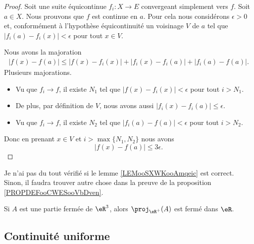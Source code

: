 \begin{proof}
	Soit une suite équicontinue \( f_i\colon X\to E\) convergeant simplement vers \( f\). Soit \( a\in X\). Nous prouvons que \( f\) est continue en \( a\). Pour cela nous considérons \( \epsilon>0\) et, conformément à l'hypothèse équicontinuité un voisinage \( V\) de \( a\) tel que \( | f_i(a)-f_i(x) |<\epsilon\) pour tout \( x\in V\).

	Nous avons la majoration
	\begin{subequations}
		\begin{align}
			| f(x)-f(a) |\leq | f(x)-f_i(x) |+| f_i(x)-f_i(a) |+| f_i(a)-f(a) |.
		\end{align}
	\end{subequations}
	Plusieurs majorations.
	\begin{itemize}
		\item
		      Vu que \( f_i\to f\), il existe \( N_1\) tel que \( | f(x)-f_i(x) |<\epsilon\) pour tout \( i>N_1\).
		\item
		      De plus, par définition de \( V\), nous avons aussi \( | f_i(x)-f_i(a) |\leq \epsilon\).
		\item
		      Vu que \( f_i\to f\), il existe \( N_2\) tel que \( | f_i(a)-f(a) |<\epsilon\) pour tout \( i>N_2\).
	\end{itemize}
	Donc en prenant \( x\in V\) et \( i>\max\{ N_1,N_2 \}\) nous avons
	\begin{equation}
		| f(x)-f(a) |\leq 3\epsilon.
	\end{equation}
\end{proof}


\begin{probleme}
	Je n'ai pas du tout vérifié si le lemme \ref{LEMooSXWKooAmqeic} est correct. Sinon, il faudra trouver autre chose dans la preuve de la proposition \ref{PROPDEFooCWESooVbDven}.
\end{probleme}
\begin{lemma}		\label{LEMooSXWKooAmqeic}
	Si \( A\) est une partie fermée de \( \eR^3\), alors \( \proj_{\eR^+}(A)\) est fermé dans \( \eR\).
\end{lemma}

\subsection{Continuité uniforme}

